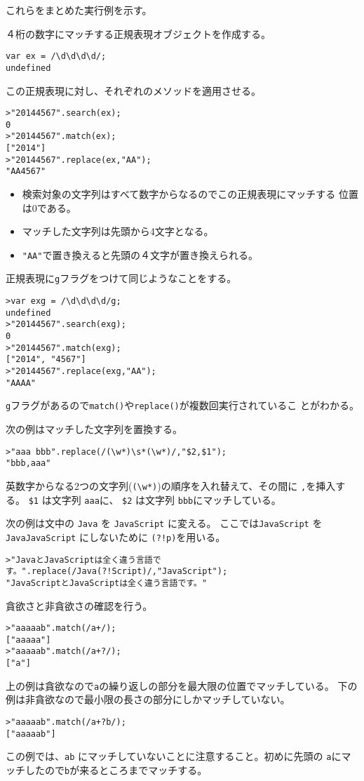 これらをまとめた実行例を示す。
\begin{Exec}
４桁の数字にマッチする正規表現オブジェクトを作成する。
\begin{verbatim}
var ex = /\d\d\d\d/;
undefined
\end{verbatim}
この正規表現に対し、それぞれのメソッドを適用させる。
\begin{verbatim}
>"20144567".search(ex);
0
>"20144567".match(ex);
["2014"]
>"20144567".replace(ex,"AA");
"AA4567"
\end{verbatim}
\begin{itemize}
 \item 検索対象の文字列はすべて数字からなるのでこの正規表現にマッチする
       位置は$0$である。
 \item マッチした文字列は先頭から4文字となる。
 \item \verb+"AA"+で置き換えると先頭の４文字が置き換えられる。
\end{itemize}
正規表現に\verb+g+フラグをつけて同じようなことをする。
\begin{verbatim}
>var exg = /\d\d\d\d/g;
undefined
>"20144567".search(exg);
0
>"20144567".match(exg);
["2014", "4567"]
>"20144567".replace(exg,"AA");
"AAAA"
\end{verbatim}
\verb+g+フラグがあるので\verb+match()+や\verb+replace()+が複数回実行されているこ
 とがわかる。
\end{Exec}
\begin{Exec}\upshape
次の例はマッチした文字列を置換する。
\begin{verbatim}
>"aaa bbb".replace(/(\w*)\s*(\w*)/,"$2,$1");
"bbb,aaa"
\end{verbatim}
英数字からなる2つの文字列(\verb+(\w*)+)の順序を入れ替えて、その間に
 \verb+,+を挿入する。
\verb+$1+ は文字列 \verb+aaa+に、
\verb+$2+ は文字列 \verb+bbb+にマッチしている。
\end{Exec}
\begin{Exec}
次の例は文中の \verb+Java+ を \verb+JavaScript+ に変える。
ここでは\verb+JavaScript+ を \verb+JavaJavaScript+ にしないために
\verb+(?!p)+を用いる。
\begin{verbatim}
>"JavaとJavaScriptは全く違う言語です。".replace(/Java(?!Script)/,"JavaScript");
"JavaScriptとJavaScriptは全く違う言語です。"
\end{verbatim}
\end{Exec}
\begin{Exec}\label{greedy}
 貪欲さと非貪欲さの確認を行う。
\begin{verbatim}
>"aaaaab".match(/a+/);
["aaaaa"]
>"aaaaab".match(/a+?/);
["a"]
\end{verbatim}
上の例は貪欲なので\verb+a+の繰り返しの部分を最大限の位置でマッチしている。
下の例は非貪欲なので最小限の長さの部分にしかマッチしていない。
\begin{verbatim}
>"aaaaab".match(/a+?b/);
["aaaaab"]
\end{verbatim}
この例では、\verb+ab+ にマッチしていないことに注意すること。初めに先頭の
 \verb+a+にマッチしたので\verb+b+が来るところまでマッチする。
\end{Exec}
